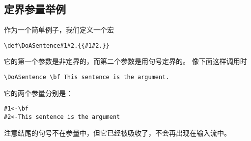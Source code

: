 \documentclass[letterpaper]{book}
\begin{document}
\subsection{定界参量举例}

作为一个简单例子，我们定义一个宏
\begin{verbatim}
\def\DoASentence#1#2.{{#1#2.}}
\end{verbatim}
它的第一个参数是非定界的，而第二个参数是用句号定界的。
像下面这样调用时
\begin{verbatim}
\DoASentence \bf This sentence is the argument.
\end{verbatim}
它的两个参量分别是：
\begin{verbatim}
#1<-\bf
#2<-This sentence is the argument
\end{verbatim}
注意结尾的句号不在参量中，但它已经被吸收了，不会再出现在输入流中。

\end{document}

